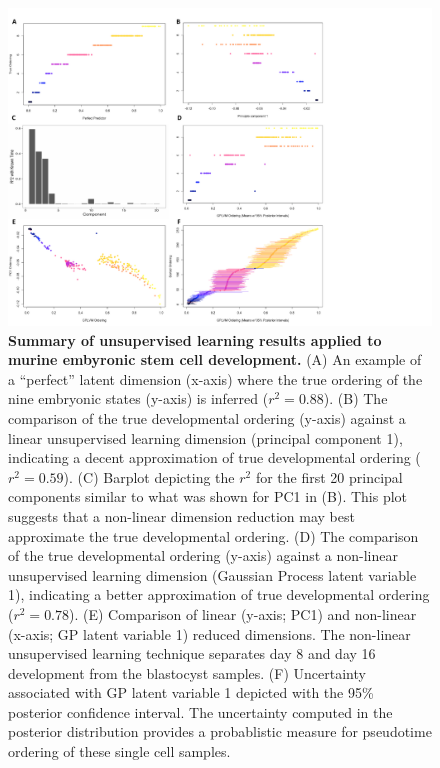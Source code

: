 \documentclass[english, 11pt]{article}\usepackage[]{graphicx}\usepackage[]{color}
\begin{document}
\begin{figure}[H]
\begin{center}
\includegraphics[scale=0.8]{images/Figure3.pdf}
\end{center}
\caption{\textbf{Summary of unsupervised learning results applied to murine embyronic stem cell development.} (A) An example of a ``perfect'' latent dimension (x-axis) where the true ordering of the nine embryonic states (y-axis) is inferred ($r^2 = 0.88$). (B) The comparison of the true developmental ordering (y-axis) against a linear unsupervised learning dimension (principal component 1), indicating a decent approximation of true developmental ordering ($r^2 = 0.59$). (C) Barplot depicting the $r^2$ for the first 20 principal components similar to what was shown for PC1 in (B). This plot suggests that a non-linear dimension reduction may best approximate the true developmental ordering. (D) The comparison of the true developmental ordering (y-axis) against a non-linear unsupervised learning dimension (Gaussian Process latent variable 1), indicating a better approximation of true developmental ordering ($r^2 = 0.78$). (E) Comparison of linear (y-axis; PC1) and non-linear (x-axis; GP latent variable 1) reduced dimensions. The non-linear unsupervised learning technique separates day 8 and day 16 development from the blastocyst samples. (F) Uncertainty associated with GP latent variable 1 depicted with the 95\% posterior confidence interval. The uncertainty computed in the posterior distribution provides a probablistic measure for pseudotime ordering of these single cell samples. }
\end{figure}
\end{document}
